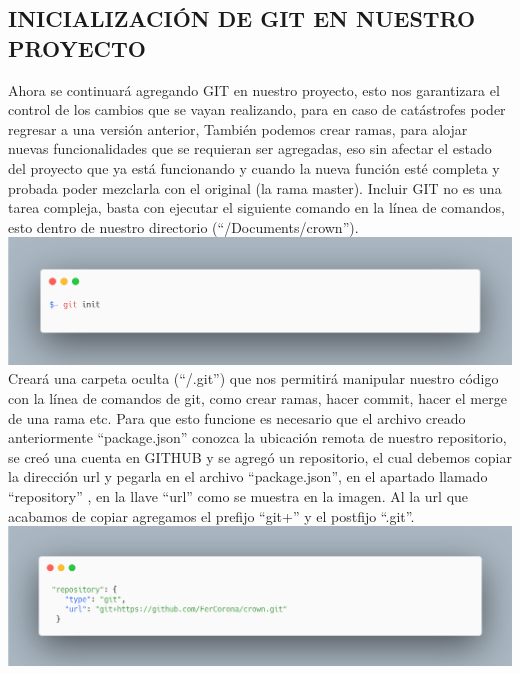 \subsection{INICIALIZACIÓN DE GIT EN NUESTRO PROYECTO }
Ahora se continuará agregando GIT en nuestro proyecto, esto nos garantizara el control de los cambios que se vayan realizando, para en caso de catástrofes poder regresar a una versión anterior, También podemos crear ramas,  para alojar nuevas funcionalidades que se requieran ser agregadas, eso sin afectar el estado del proyecto que ya está funcionando y cuando la nueva función esté completa y probada poder mezclarla con el original (la rama master).
Incluir GIT no es una tarea compleja, basta con ejecutar el siguiente comando en la línea de comandos, esto dentro de nuestro directorio (“/Documents/crown”).
\newline
\newline
\includegraphics[width=1\textwidth]{./Imagenes/image35.png}
\newline
Creará una carpeta oculta (“/.git”) que nos permitirá manipular nuestro código con la línea de comandos de git, como crear ramas, hacer commit, hacer el merge de una rama etc.
Para que esto funcione es necesario que el archivo creado anteriormente “package.json” conozca la ubicación remota de nuestro repositorio, se creó una cuenta en GITHUB  y se agregó un repositorio, el cual debemos copiar la dirección url y pegarla en el archivo “package.json”,  en el apartado llamado “repository” , en la llave “url” como se muestra en la imagen.
Al la url que acabamos de copiar agregamos el prefijo “git+” y el postfijo “.git”.
\newline
\newline
\includegraphics[width=1\textwidth]{./Imagenes/image4.png}
\newline


